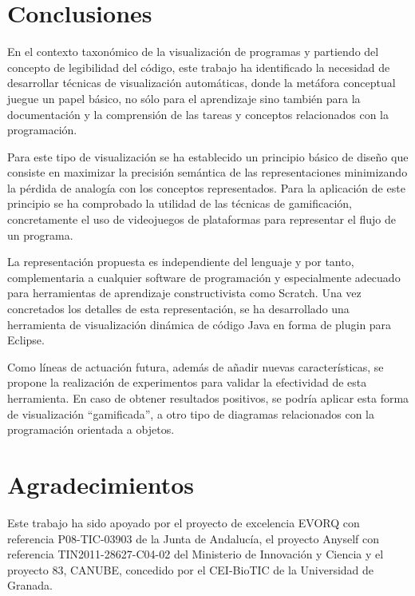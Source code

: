 \documentclass{llncs}
\begin{document}

\section{Conclusiones}
\label{sec:conclusions}

En el contexto taxonómico de la visualización de programas y partiendo del concepto de legibilidad del código, este trabajo ha identificado la necesidad de desarrollar técnicas de visualización automáticas, donde la metáfora conceptual juegue un papel básico, no sólo para el aprendizaje sino también para la documentación y la comprensión de las tareas y conceptos relacionados con la programación. 

Para este tipo de visualización se ha establecido un principio básico de diseño que consiste en maximizar la precisión semántica de las representaciones minimizando la pérdida de analogía con los conceptos representados.
Para la aplicación de este principio se ha comprobado la utilidad de las técnicas de gamificación, concretamente el uso de videojuegos de plataformas para representar el flujo de un programa.

La representación propuesta es independiente del lenguaje y por tanto, complementaria a cualquier software de programación y especialmente adecuado para herramientas de aprendizaje constructivista como Scratch. Una vez concretados los detalles de esta representación, se ha desarrollado una herramienta de visualización dinámica de código Java en forma de plugin para Eclipse. 

Como líneas de actuación futura, además de añadir nuevas características, se propone la realización de experimentos para validar la efectividad de esta herramienta. En caso de obtener resultados positivos, se podría aplicar esta forma de visualización ``gamificada'', a otro tipo de diagramas relacionados con la programación orientada a objetos. 




\section*{Agradecimientos}
Este trabajo ha sido apoyado por el proyecto de excelencia EVORQ con
referencia P08-TIC-03903 de la Junta de Andalucía, el proyecto Anyself
con referencia TIN2011-28627-C04-02 del Ministerio de Innovación y
Ciencia y el proyecto 83, CANUBE, concedido por el CEI-BioTIC de la
Universidad de Granada. 





\end{document}
